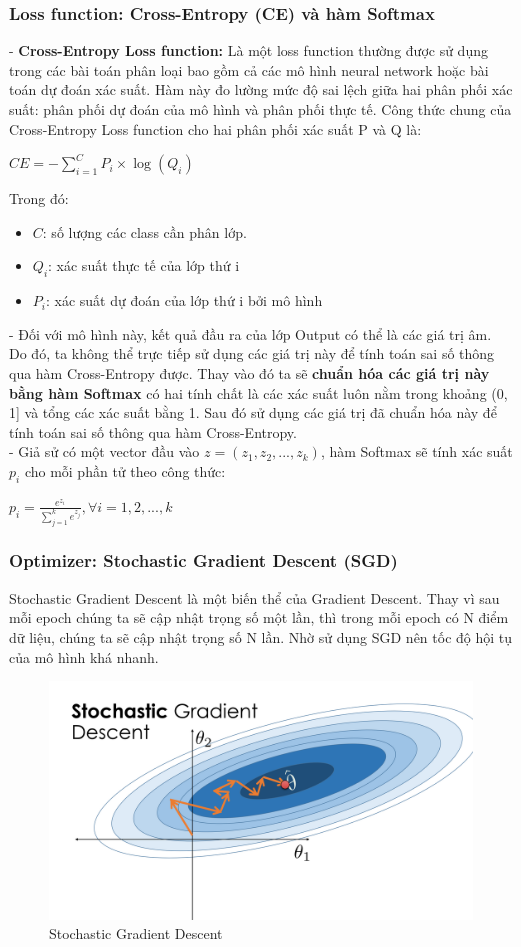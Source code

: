 \subsubsection{Loss function: Cross-Entropy (CE) và hàm Softmax}
- \textbf{Cross-Entropy Loss function:} Là một loss function thường được sử dụng trong các bài toán phân loại bao gồm cả các mô hình neural network hoặc bài toán dự đoán xác suất. Hàm này đo lường mức độ sai lệch giữa hai phân phối xác suất: phân phối dự đoán của mô hình và phân phối thực tế. Công thức chung của Cross-Entropy Loss function cho hai phân phối xác suất P và Q là: 
    \begin{center}
        \large $CE = - \sum_{i=1}^{C} P_{i}\times \log(Q_{i})$
    \end{center}
    Trong đó:
    \begin{itemize}
        \item $C$: số lượng các class cần phân lớp.
        \item $Q_{i}$: xác suất thực tế của lớp thứ i
        \item $P_{i}$: xác suất dự đoán của lớp thứ i bởi mô hình
    \end{itemize}
- Đối với mô hình này, kết quả đầu ra của lớp Output có thể là các giá trị âm. Do đó, ta không thể trực tiếp sử dụng các giá trị này để tính toán sai số thông qua hàm Cross-Entropy được. Thay vào đó ta sẽ \textbf{chuẩn hóa các giá trị này bằng hàm Softmax} có hai tính chất là các xác suất luôn nằm trong khoảng (0, 1] và tổng các xác suất bằng 1. Sau đó sử dụng các giá trị đã chuẩn hóa này để tính toán sai số thông qua hàm Cross-Entropy. 
\\- Giả sử có một vector đầu vào $z = (z_1, z_2, ..., z_k)$, hàm Softmax sẽ tính xác suất $p_i$ cho mỗi phần tử theo công thức:
\begin{center}
    \Large $p_{i}=\frac{e^{z_{i}}}{\sum_{j=1}^{k}e^{z_{j}}},\forall i=1,2,...,k$
\end{center}

\subsubsection{Optimizer: Stochastic Gradient Descent (SGD)}
Stochastic Gradient Descent là một biến thể của Gradient Descent. Thay vì sau mỗi epoch chúng ta sẽ cập nhật trọng số một lần, thì trong mỗi epoch có N điểm dữ liệu, chúng ta sẽ cập nhật trọng số N lần. Nhờ sử dụng SGD nên tốc độ hội tụ của mô hình khá nhanh.
\begin{figure}[H]
    \centering
    \includegraphics[width=0.75\linewidth]{img/SGD.png}
    \caption{Stochastic Gradient Descent}
    
\end{figure}
